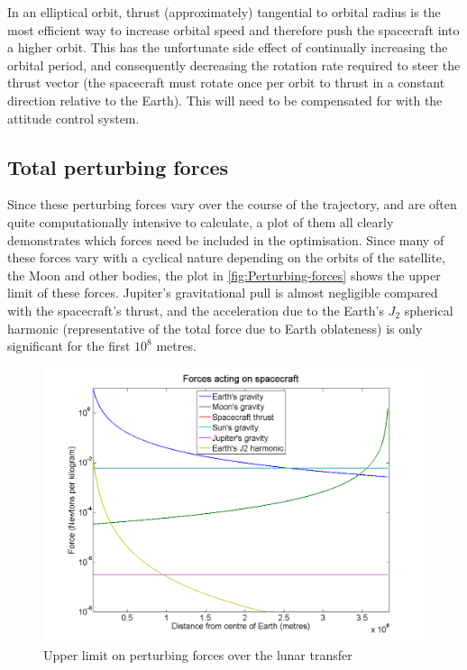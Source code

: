 In an elliptical orbit, thrust (approximately) tangential to orbital radius is the most efficient way to increase orbital speed and therefore push the spacecraft into a higher orbit. This has the unfortunate side effect of continually increasing the orbital period, and consequently decreasing the rotation rate required to steer the thrust vector (the spacecraft must rotate once per orbit to thrust in a constant direction relative to the Earth). This will need to be compensated for with the attitude control system.

\subsection{Total perturbing forces}

Since these perturbing forces vary over the course of the trajectory, and are often quite computationally intensive to calculate, a plot of them all clearly demonstrates which forces need be included in the optimisation. Since many of these forces vary with a cyclical nature depending on the orbits of the satellite, the Moon and other bodies, the plot in \autoref{fig:Perturbing-forces} shows the upper limit of these forces. Jupiter's gravitational pull is almost negligible compared with the spacecraft's thrust, and the acceleration due to the Earth's $J_{2}$ spherical harmonic (representative of the total force due to Earth oblateness) is only significant for the first $10^{8}$ metres.

\begin{figure}[h]
\begin{center}
\includegraphics[scale=0.4]{Images/relative_forces.png}
\end{center}
\caption{Upper limit on perturbing forces over the lunar transfer}
\label{fig:Perturbing-forces}
\end{figure}

